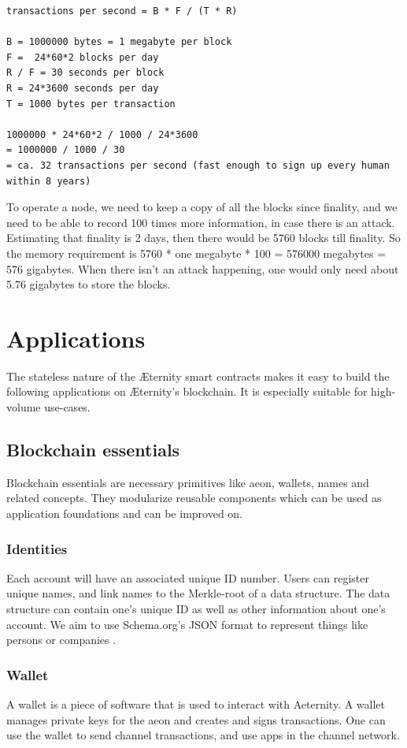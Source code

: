 \documentclass[a4paper, 10pt, conference]{ieeeconf}      %
\begin{document}
\begin{draft}
\begin{sketch}
\begin{lstlisting}
transactions per second = B * F / (T * R)

B = 1000000 bytes = 1 megabyte per block
F =  24*60*2 blocks per day
R / F = 30 seconds per block
R = 24*3600 seconds per day
T = 1000 bytes per transaction

1000000 * 24*60*2 / 1000 / 24*3600 
= 1000000 / 1000 / 30 
= ca. 32 transactions per second (fast enough to sign up every human within 8 years)
\end{lstlisting}


To operate a node, we need to keep a copy of all the blocks since finality, and we need to be able to record 100 times more information, in case there is an attack.
Estimating that finality is 2 days, then there would be 5760 blocks till finality. 
So the memory requirement is 5760 * one megabyte * 100 = 576000 megabytes = 576 gigabytes.
When there isn't an attack happening, one would only need about 5.76 gigabytes to store the blocks.
\end{sketch}


\section{Applications}
\label{sec:applications}
The stateless nature of the Æternity smart contracts makes it easy to build the following applications on Æternity's blockchain. It is especially suitable for high-volume use-cases.

\subsection{Blockchain essentials}
Blockchain essentials are necessary primitives like aeon, wallets, names and related concepts. They modularize reusable components which can be used as application foundations and can be improved on.

\subsubsection{Identities}
Each account will have an associated unique ID number. Users can register unique names, and link names to the Merkle-root of a data structure. The data structure can contain one's unique ID as well as other information about one's account. We aim to use Schema.org's JSON format to represent things like persons or companies \cite{schemaorg}. 

\subsubsection{Wallet}
A wallet is a piece of software that is used to interact with Aeternity. A wallet manages private keys for the aeon and creates and signs transactions. 
One can use the wallet to send channel transactions, and use apps in the channel network. %


\end{draft}
\end{document}
